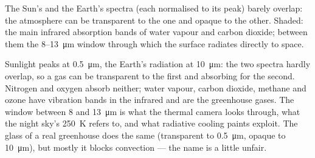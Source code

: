 \begin{omfigure}

{\small The Sun's and the Earth's spectra (each normalised to its
peak) barely overlap: the atmosphere can be transparent to the one and
opaque to the other. Shaded: the main infrared absorption bands of
water vapour and carbon dioxide; between them the \qty{8}{}--\qty{13}{\micro m}
window through which the surface radiates directly to space.}
\end{omfigure}

\begin{remark}\label{rem:b2:thermal-radiation:selective}
Sunlight peaks at \qty{0.5}{\micro m}, the Earth's radiation at
\qty{10}{\micro m}: the two spectra hardly overlap, so a gas can be
transparent to the first and absorbing for the second. Nitrogen and
oxygen absorb neither; water vapour, carbon dioxide, methane and ozone
have vibration bands in the infrared and are the greenhouse gases. The
window between \qty{8}{} and \qty{13}{\micro m} is what the thermal camera
looks through, what the night sky's \qty{250}{K} refers to, and what
radiative cooling paints exploit. The glass of a real greenhouse does
the same (transparent to \qty{0.5}{\micro m}, opaque to \qty{10}{\micro m}),
but mostly it blocks convection --- the name is a little unfair.
\end{remark}

